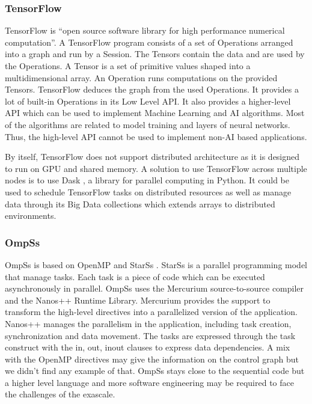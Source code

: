 \subsubsection{TensorFlow}
TensorFlow \cite{AABBC2016} is “open source software library for high performance numerical computation”.
A TensorFlow program consists of a set of Operations arranged into a graph and run by a Session.
The Tensors contain the data and are used by the Operations.
A Tensor is a set of primitive values shaped into a multidimensional array.
An Operation runs computations on the provided Tensors.
TensorFlow deduces the graph from the used Operations.
It provides a lot of built-in Operations in its Low Level API.
It also provides a higher-level API which can be used to implement Machine Learning and AI algorithms.
Most of the algorithms are related to model training and layers of neural networks.
Thus, the high-level API cannot be used to implement non-AI based applications.

By itself, TensorFlow does not support distributed architecture as it is designed to run on GPU and shared memory.
A solution to use TensorFlow across multiple nodes is to use Dask \cite{Dask2016}, a library for parallel computing in Python.
It could be used to schedule TensorFlow tasks on distributed resources as well as manage data through its Big Data collections which extends arrays to distributed environments.

\subsubsection{OmpSs}
OmpSs \cite{DABLM2011} is based on OpenMP \cite{DaguM1998} and StarSs \cite{PerRL2007}.
StarSs is a parallel programming model that manage tasks.
Each task is a piece of code which can be executed asynchronously in parallel.
OmpSs uses the Mercurium source-to-source compiler and the Nanos++ Runtime Library.
Mercurium provides the support to transform the high-level directives into a parallelized version of the application.
Nanos++ manages the parallelism in the application, including task creation, synchronization and data movement.
The tasks are expressed through the task construct with the in, out, inout clauses to express data dependencies.
A mix with the OpenMP directives may give the information on the control graph but we didn't find any example of that.
OmpSs stays close to the sequential code but a higher level language and more software engineering may be required to face the challenges of the exascale.


